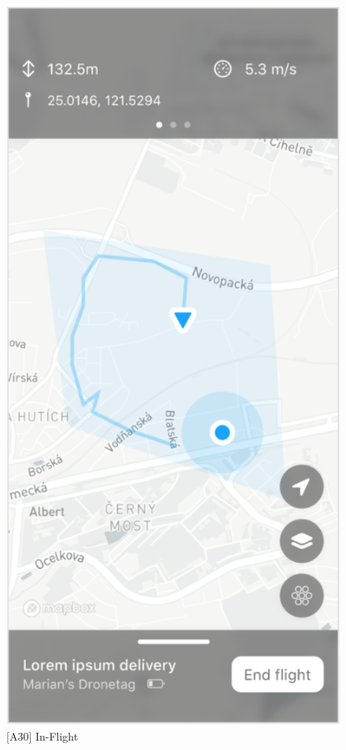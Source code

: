 \begin{figure}
    \centering
    \begin{minipage}{.45\textwidth}
        \centering
        \includegraphics[width=.7\linewidth]{assets/user_interface_design/flight/in_flight.png}
        \caption{[A30] In-Flight}
        \label{fig:in_flight}
    \end{minipage}%
    \hspace{.05\linewidth}
    \begin{minipage}{.45\textwidth}
        \centering

\end{minipage}
\end{figure}
